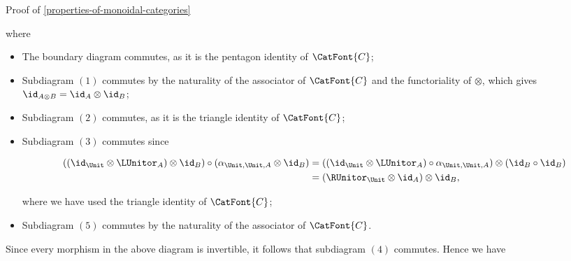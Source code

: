 \begin{Proof}{Proof of \cref{properties-of-monoidal-categories}}
\begin{scalemath}
    \end{scalemath}
    where
    \begin{itemize}
        \item The boundary diagram commutes, as it is the pentagon identity of $\CatFont{C}$;
        \item Subdiagram $(1)$ commutes by the naturality of the associator of $\CatFont{C}$ and the functoriality of $\otimes$, which gives $\id_{A\otimes B}=\id_{A}\otimes\id_{B}$;
        \item Subdiagram $(2)$ commutes, as it is the triangle identity of $\CatFont{C}$;
        \item Subdiagram $(3)$ commutes since
            \begin{envsmallsize}
                \begin{align*}
                    ((\id_{\Unit}\otimes\LUnitor_{A})\otimes\id_{B})\circ(\alpha_{\Unit,\Unit,A}\otimes\id_{B}) &= ((\id_{\Unit}\otimes\LUnitor_{A})\circ\alpha_{\Unit,\Unit,A})\otimes(\id_{B}\circ\id_{B})\\
                                                                                                            &= (\RUnitor_{\Unit}\otimes\id_{A})\otimes\id_{B},
                \end{align*}
            \end{envsmallsize}
            where we have used the triangle identity of $\CatFont{C}$;
        \item Subdiagram $(5)$ commutes by the naturality of the associator of $\CatFont{C}$.
    \end{itemize}
    Since every morphism in the above diagram is invertible, it follows that subdiagram $(4)$ commutes. Hence we have

\end{Proof}
